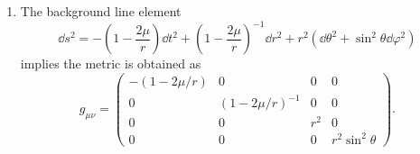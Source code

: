 \documentclass[a4paper,pdftex,10pt]{article}
\begin{document}
\maketitle

\begin{enumerate}
  \item 
  The background line element
  \begin{equation}
    \dd s^2
    =
    -
    \left( 1-\frac{2\mu}{r} \right)\dd t^2
    +
    \left( 1-\frac{2\mu}{r} \right)^{-1}\dd r^2
    +
    r^2
    (\dd\theta^2+\sin^2\theta\dd\varphi^2)
  \end{equation}
  implies the metric is obtained as
  \begin{equation}
    g_{\mu\nu}
    =
    \begin{pmatrix}
      -\left( 1-2\mu/r \right) & 0 & 0 & 0 \\
      0 & \left( 1-2\mu/r \right)^{-1} & 0 & 0 \\
      0 & 0 & r^2 & 0 \\
      0 & 0 & 0 & r^2\sin^2\theta
    \end{pmatrix}
    .
  \end{equation}
  












\end{enumerate}



% 
% 

\end{document}
